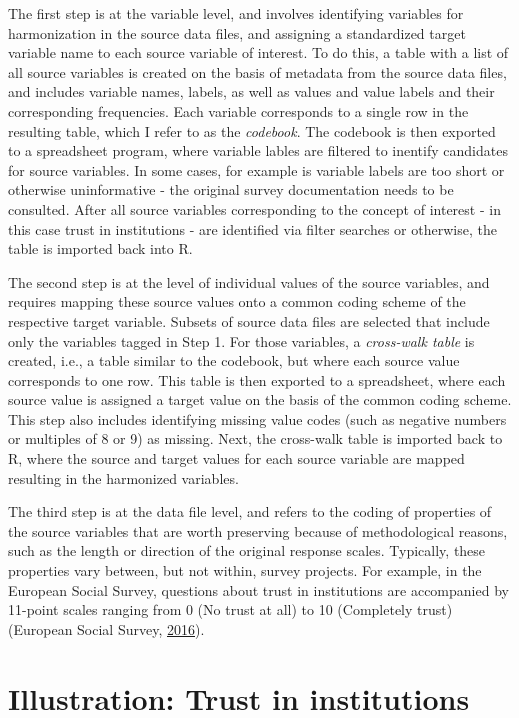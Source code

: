 \documentclass[12pt,]{article}
\begin{document}
The first step is at the variable level, and involves identifying variables for harmonization in the source data files, and assigning a standardized target variable name to each source variable of interest. To do this, a table with a list of all source variables is created on the basis of metadata from the source data files, and includes variable names, labels, as well as values and value labels and their corresponding frequencies. Each variable corresponds to a single row in the resulting table, which I refer to as the \emph{codebook}. The codebook is then exported to a spreadsheet program, where variable lables are filtered to inentify candidates for source variables. In some cases, for example is variable labels are too short or otherwise uninformative - the original survey documentation needs to be consulted. After all source variables corresponding to the concept of interest - in this case trust in institutions - are identified via filter searches or otherwise, the table is imported back into R.

The second step is at the level of individual values of the source variables, and requires mapping these source values onto a common coding scheme of the respective target variable. Subsets of source data files are selected that include only the variables tagged in Step 1. For those variables, a \emph{cross-walk table} is created, i.e., a table similar to the codebook, but where each source value corresponds to one row. This table is then exported to a spreadsheet, where each source value is assigned a target value on the basis of the common coding scheme. This step also includes identifying missing value codes (such as negative numbers or multiples of 8 or 9) as missing. Next, the cross-walk table is imported back to R, where the source and target values for each source variable are mapped resulting in the harmonized variables.

The third step is at the data file level, and refers to the coding of properties of the source variables that are worth preserving because of methodological reasons, such as the length or direction of the original response scales. Typically, these properties vary between, but not within, survey projects. For example, in the European Social Survey, questions about trust in institutions are accompanied by 11-point scales ranging from 0 (No trust at all) to 10 (Completely trust) (European Social Survey, \protect\hyperlink{ref-ESS2016b}{2016}).

\hypertarget{illustration-trust-in-institutions}{%
\section{Illustration: Trust in institutions}\label{illustration-trust-in-institutions}}
\end{document}
